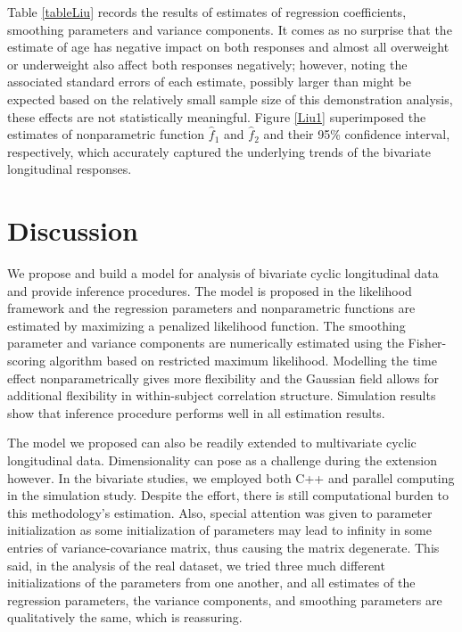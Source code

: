 \documentclass[article,lineno]{biometrika}
\begin{document}
Table \ref{tableLiu} records the results of estimates of regression coefficients, smoothing parameters and variance components. It comes as no surprise that the estimate of age has negative impact on both responses and almost all overweight or underweight also affect  both responses negatively; however, noting the associated standard errors of each estimate, possibly larger than might be expected based on the relatively small sample size of this demonstration analysis, these effects are not statistically meaningful. 
Figure \ref{Liu1} superimposed the estimates of nonparametric function $\hat f_1$ and $\hat f_2$ and their 95\% confidence interval, respectively, which accurately captured the underlying trends of the bivariate longitudinal responses.


%
%
%
\section{Discussion}

We propose and build a model for analysis of bivariate cyclic longitudinal data and provide inference procedures. The model is proposed in the likelihood framework and the regression parameters and nonparametric functions are estimated by maximizing a penalized likelihood function.  
The smoothing parameter and variance components are numerically estimated using the Fisher-scoring algorithm based on restricted maximum likelihood.
Modelling the time effect nonparametrically gives more flexibility and the Gaussian field allows for additional flexibility in within-subject correlation structure. Simulation results show that inference procedure performs well in all estimation results.

The model we proposed can also be readily extended to multivariate cyclic longitudinal data.   
Dimensionality can pose as a challenge during the extension however. In the bivariate studies, we employed both C++ and parallel computing in the simulation study. Despite the effort, there is still computational burden to this methodology's estimation. Also, special attention was given to parameter initialization as some initialization of parameters may lead to infinity in some entries of variance-covariance matrix, thus causing the matrix degenerate. This said, in the analysis of the real dataset, we tried three much different initializations of the parameters from one another, and all estimates of the regression parameters, the variance components, and smoothing parameters are qualitatively the same, which is reassuring. 
\end{document}
